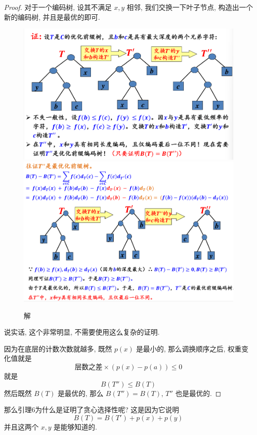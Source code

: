 \documentclass[a4paper, 10pt]{ctexart} %
\begin{document}
\begin{proof}
    对于一个编码树, 设其不满足 $x, y$ 相邻, 我们交换一下叶子节点, 构造出一个新的编码树, 并且是最优的即可.
    \begin{figure}[H]
        \centering
        \includegraphics[scale = 0.5]{4.png}
        \includegraphics[scale = 0.5]{5.png}
        \caption{解}
    \end{figure}
    说实话, 这个非常明显, 不需要使用这么复杂的证明. 

    因为在底层的计数次数就越多, 既然 $p\left(x\right)$ 是最小的, 那么调换顺序之后, 
    权重变化值就是 
    \[
    \text{层数之差} \times \left( p(x) - p(a)\right) \le 0
    \]
    就是
    \[
    B \left(T''\right) \le B \left(T\right)
    \]
    然后既然 $B \left(T\right)$ 是最优的, 那么 $B \left(T''\right) = B\left(T\right)$, $T''$ 也是最优的.
\end{proof}

那么引理6为什么是证明了贪心选择性呢? 
这是因为它说明
\[
B \left(T\right)= B (T') + p (x) + p (y)
\]
并且这两个 $x, y$ 是能够知道的. 
\end{document}
